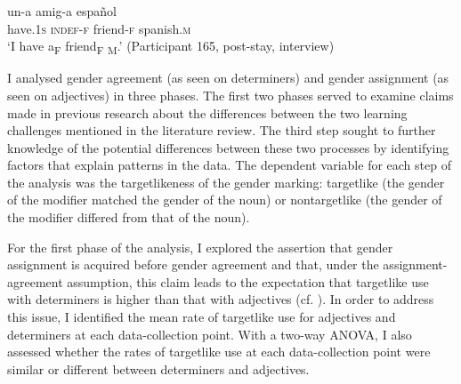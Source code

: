 \documentclass[output=paper,colorlinks,citecolor=brown,modfonts,nonflat]{../langscibook}
\begin{document}
\ea%
    \label{ex:gudmestad:2}
      {un-a}  {amig-a}  {español}  \\
        have.1\textsc{s} \textsc{indef}-\textsc{f} friend-\textsc{f} spanish.\textsc{m}\\
\glt ‘I have a\textsubscript{F} friend\textsubscript{F} \textsubscript{M}.’ (Participant 165, post-stay, interview)
\z



I analysed gender agreement (as seen on determiners) and gender assignment (as seen on adjectives) in three phases. The first two phases served to examine claims made in previous research about the differences between the two learning challenges mentioned in the literature review. The third step sought to further knowledge of the potential differences between these two processes by identifying factors that explain patterns in the data. The dependent variable for each step of the analysis was the targetlikeness of the gender marking: targetlike (the gender of the modifier matched the gender of the noun) or nontargetlike (the gender of the modifier differed from that of the noun).



For the first phase of the analysis, I explored the assertion that gender assignment is acquired before gender agreement and that, under the assignment-agreement assumption, this claim leads to the expectation that targetlike use with determiners is higher than that with adjectives (cf. \citealt{Alarcón2010}). In order to address this issue, I identified the mean rate of targetlike use for adjectives and determiners at each data-collection point. With a two-way ANOVA, I also assessed whether the rates of targetlike use at each data-collection point were similar or different between determiners and adjectives.
\end{document}
